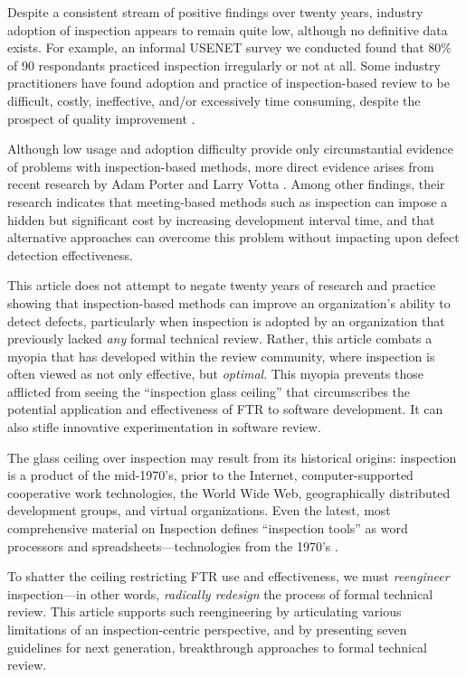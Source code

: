 Despite a consistent stream of positive findings over twenty years,
industry adoption of inspection appears to remain quite low, although no
definitive data exists.  For example, an informal USENET survey we
conducted found that 80\% of 90 respondants practiced inspection
irregularly or not at all.  Some industry practitioners have found adoption
and practice of inspection-based review to be difficult, costly,
ineffective, and/or excessively time consuming, despite the prospect of
quality improvement \cite{Brykczynski94a}.

Although low usage and adoption difficulty provide only circumstantial
evidence of problems with inspection-based methods, more direct evidence
arises from recent research by Adam Porter \cite{Porter95} and
Larry Votta \cite{Votta93}. Among other findings, their research indicates
that meeting-based methods such as inspection can impose a hidden but
significant cost by increasing development interval time, and that
alternative approaches can overcome this problem without impacting upon
defect detection effectiveness.

This article does not attempt to negate twenty years of research and
practice showing that inspection-based methods can improve an
organization's ability to detect defects, particularly when inspection is
adopted by an organization that previously lacked {\em any} formal
technical review. Rather, this article combats a myopia that
has developed within the review community, where inspection is often viewed as
not only effective, but {\em optimal}. This myopia prevents those afflicted
from seeing the ``inspection glass ceiling'' that circumscribes the
potential application and effectiveness of FTR to software development.  It
can also stifle innovative experimentation in software review.

The glass ceiling over inspection may result from its historical origins:
inspection is a product of the mid-1970's, prior to the Internet,
computer-supported cooperative work technologies, the World Wide Web,
geographically distributed development groups, and virtual
organizations. Even the latest, most comprehensive material on Inspection
defines ``inspection tools'' as word processors and
spreadsheets---technologies from the 1970's \cite{Gilb93}. 

To shatter the ceiling restricting FTR use and effectiveness, we must {\em
  reengineer} inspection---in other words, {\em radically redesign} the
process of formal technical review.  This article supports such
reengineering by articulating various limitations of an inspection-centric
perspective, and by presenting seven guidelines for next generation,
breakthrough approaches to formal technical review.


